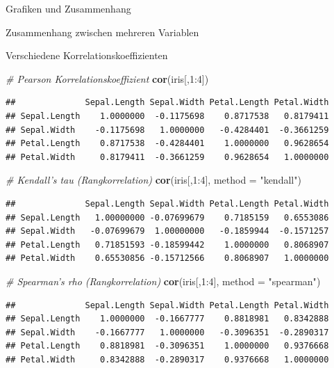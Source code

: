 \documentclass[ignorenonframetext,]{beamer}
\newenvironment{Shaded}{}{}
\newcommand{\KeywordTok}[1]{\textcolor[rgb]{0.00,0.44,0.13}{\textbf{{#1}}}}
\newcommand{\DataTypeTok}[1]{\textcolor[rgb]{0.56,0.13,0.00}{{#1}}}
\newcommand{\DecValTok}[1]{\textcolor[rgb]{0.25,0.63,0.44}{{#1}}}
\newcommand{\StringTok}[1]{\textcolor[rgb]{0.25,0.44,0.63}{{#1}}}
\newcommand{\CommentTok}[1]{\textcolor[rgb]{0.38,0.63,0.69}{\textit{{#1}}}}
\newcommand{\NormalTok}[1]{{#1}}
\begin{document}
\begin{frame}[fragile]{Grafiken und Zusammenhang}
\begin{block}{Zusammenhang zwischen mehreren Variablen}
\end{block}

\begin{block}{Verschiedene Korrelationskoeffizienten}

\begin{Shaded}
\begin{Highlighting}[]
\CommentTok{# Pearson Korrelationskoeffizient}
\KeywordTok{cor}\NormalTok{(iris[,}\DecValTok{1}\NormalTok{:}\DecValTok{4}\NormalTok{]) }
\end{Highlighting}
\end{Shaded}

\begin{verbatim}
##              Sepal.Length Sepal.Width Petal.Length Petal.Width
## Sepal.Length    1.0000000  -0.1175698    0.8717538   0.8179411
## Sepal.Width    -0.1175698   1.0000000   -0.4284401  -0.3661259
## Petal.Length    0.8717538  -0.4284401    1.0000000   0.9628654
## Petal.Width     0.8179411  -0.3661259    0.9628654   1.0000000
\end{verbatim}

\begin{Shaded}
\begin{Highlighting}[]
\CommentTok{# Kendall's tau (Rangkorrelation)}
\KeywordTok{cor}\NormalTok{(iris[,}\DecValTok{1}\NormalTok{:}\DecValTok{4}\NormalTok{], }\DataTypeTok{method =} \StringTok{"kendall"}\NormalTok{) }
\end{Highlighting}
\end{Shaded}

\begin{verbatim}
##              Sepal.Length Sepal.Width Petal.Length Petal.Width
## Sepal.Length   1.00000000 -0.07699679    0.7185159   0.6553086
## Sepal.Width   -0.07699679  1.00000000   -0.1859944  -0.1571257
## Petal.Length   0.71851593 -0.18599442    1.0000000   0.8068907
## Petal.Width    0.65530856 -0.15712566    0.8068907   1.0000000
\end{verbatim}

\begin{Shaded}
\begin{Highlighting}[]
\CommentTok{# Spearman's rho (Rangkorrelation)}
\KeywordTok{cor}\NormalTok{(iris[,}\DecValTok{1}\NormalTok{:}\DecValTok{4}\NormalTok{], }\DataTypeTok{method =} \StringTok{"spearman"}\NormalTok{) }
\end{Highlighting}
\end{Shaded}

\begin{verbatim}
##              Sepal.Length Sepal.Width Petal.Length Petal.Width
## Sepal.Length    1.0000000  -0.1667777    0.8818981   0.8342888
## Sepal.Width    -0.1667777   1.0000000   -0.3096351  -0.2890317
## Petal.Length    0.8818981  -0.3096351    1.0000000   0.9376668
## Petal.Width     0.8342888  -0.2890317    0.9376668   1.0000000
\end{verbatim}


\end{block}
\end{frame}
\end{document}

